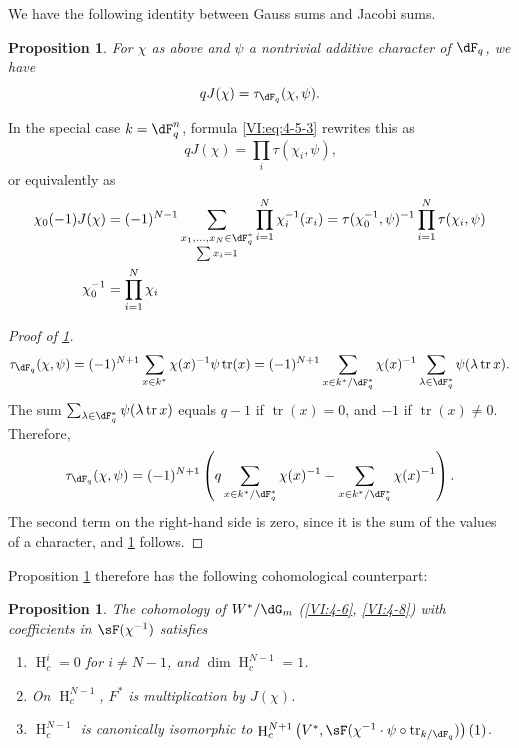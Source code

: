 \documentclass[oneside]{book}
\DeclareMathOperator{\h}{H}
\DeclareMathOperator{\tr}{tr}
\newcounter{char}
\theoremstyle{sga-source}
\theoremstyle{sga-source-dash}
\theoremstyle{sga-source-dotdash}
\theoremstyle{sga-source-number-note-dash}
\theoremstyle{sga-source-note-number-dotdash}
\theoremstyle{sga-source-example-dotdash}
\theoremstyle{sga-source-inline-number}
\theoremstyle{sga-source-bare-number}
\theoremstyle{sga-source}
\newtheorem{proposition_}[subsection]{Proposition}
\newcommand{\PrintPage}[1]{}\newcommand{\MathPage}[1]{}\newcommand{\PrintCite}[2]{#1}\newcommand{\var}[3]{#1}
\begin{document}
We have the following identity between Gauss sums and Jacobi sums. 





\PrintPage{204}
\begin{proposition_}\label{VI:4-15}
For $\chi$ as above and $\psi$ a nontrivial additive character of 
$\dF_q$, we have 
\[
  q J(\chi) = \tau_{\dF_q}(\chi,\psi) \text{.} 
\]
\end{proposition_}

In the special case $k=\dF_q^n$, formula \eqref{VI:eq:4-5-3} rewrites this as 
\begin{equation*}\tag{4.15.1}\label{VI:eq:4-15-1}
  q J(\chi) = \prod_i \tau(\chi_i,\psi) \text{,} 
\end{equation*}
or equivalently as 
\begin{align*}
  \chi_0(-1) J(\chi) &= (-1)^{N-1} \sum_{\substack{x_1,\dots,x_N\in \dF_q^\ast \\ \sum x_i = 1}} \prod_{i=1}^N \chi_i^{-1}(x_i) = \tau(\chi_0^{-1},\psi)^{-1} \prod_{i=1}^N \tau(\chi_i,\psi) \\
  \chi_0^{-1} &= \prod_{i=1}^N \chi_i 
\end{align*}





\begin{proof}[Proof of \ref{VI:4-15}]
\[
  \tau_{\dF_q}(\chi,\psi) = (-1)^{N+1} \sum_{x\in k^\ast} \chi(x)^{-1} \psi \tr(x) = (-1)^{N+1} \sum_{x\in k^\ast/\dF_q^\ast} \chi(x)^{-1} \sum_{\lambda\in \dF_q^\ast} \psi(\lambda \tr x) \text{.}
\]
The sum $\sum_{\lambda\in \dF_q^\ast} \psi(\lambda \tr x)$ equals $q-1$ if 
$\tr(x)=0$, and $-1$ if $\tr(x)\ne 0$. Therefore, 
\[
  \tau_{\dF_q}(\chi,\psi) = (-1)^{N+1} \left(\var{q\sum_{x\in k^\ast/\dF_q^\ast} \chi(x)^{-1}}{q\sum_{\substack{x\in k^\ast/\dF_q^\ast\\\tr(x)=0}} \chi(x)^{-1}}{S45-SOL-0843} - \sum_{x\in k^\ast/\dF_q^\ast} \chi(x)^{-1}\right) \text{.}
\]
The second term on the right-hand side is zero, since it is the sum of the values 
of a character, and \ref{VI:4-15} follows. 
\end{proof}

Proposition \ref{VI:4-15} therefore has the following cohomological counterpart: 





\begin{proposition_}\label{VI:4-16}
The cohomology of $W^\ast/\dG_m$ (\ref{VI:4-6}, \ref{VI:4-8}) with coefficients 
in $\sF(\chi^{-1})$ satisfies 
\begin{enumerate}[\indent (i)]
  \item $\h_c^i=0$ for $i\ne N-1$, and $\dim \h_c^{N-1}{}=1$. 
  \item On $\h_c^{N-1}$, $F^\ast$ is multiplication by $J(\chi)$. 
  \item $\h_c^{N-1}$ is canonically isomorphic to 
    $\h_c^{N+1}\left(V^\ast,\sF(\chi^{-1}\cdot \psi\circ \tr_{k/\dF_q})\right)(1)$. 
\end{enumerate}
\end{proposition_}
\end{document}
